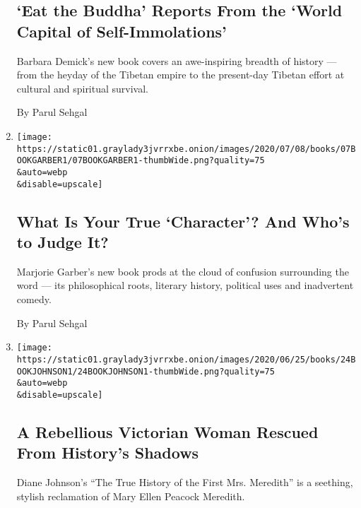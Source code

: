\begin{enumerate}
{  \subsection{`Eat the Buddha' Reports From the `World Capital of
  Self-Immolations'}\label{eat-the-buddha-reports-from-the-world-capital-of-self-immolations}}

  Barbara Demick's new book covers an awe-inspiring breadth of history
  --- from the heyday of the Tibetan empire to the present-day Tibetan
  effort at cultural and spiritual survival.

  By Parul Sehgal
\item
  \href{/2020/07/07/books/review-character-history-cultural-obsession-marjorie-garber.html}{}

  \texttt{[image: https://static01.graylady3jvrrxbe.onion/images/2020/07/08/books/07BOOKGARBER1/07BOOKGARBER1-thumbWide.png?quality=75\\\&auto=webp\\\&disable=upscale]}

  \hypertarget{what-is-your-true-character-and-whos-to-judge-it}{%
  \subsection{What Is Your True `Character'? And Who's to Judge
  It?}\label{what-is-your-true-character-and-whos-to-judge-it}}

  Marjorie Garber's new book prods at the cloud of confusion surrounding
  the word --- its philosophical roots, literary history, political uses
  and inadvertent comedy.

  By Parul Sehgal
\item
  \href{/2020/06/24/books/review-true-history-first-mrs-meredith-diane-johnson.html}{}

  \texttt{[image: https://static01.graylady3jvrrxbe.onion/images/2020/06/25/books/24BOOKJOHNSON1/24BOOKJOHNSON1-thumbWide.png?quality=75\\\&auto=webp\\\&disable=upscale]}

  \hypertarget{a-rebellious-victorian-woman-rescued-from-historys-shadows}{%
  \subsection{A Rebellious Victorian Woman Rescued From History's
  Shadows}\label{a-rebellious-victorian-woman-rescued-from-historys-shadows}}

  Diane Johnson's ``The True History of the First Mrs. Meredith'' is a
  seething, stylish reclamation of Mary Ellen Peacock Meredith.


\end{enumerate}
